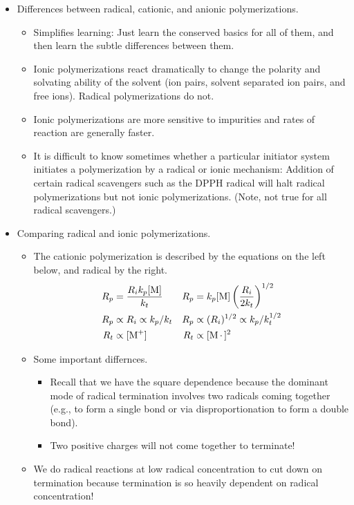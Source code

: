 \documentclass[../notes.tex]{subfiles}
\begin{document}
\begin{itemize}
    \item Differences between radical, cationic, and anionic polymerizations.
    \begin{itemize}
        \item Simplifies learning: Just learn the conserved basics for all of them, and then learn the subtle differences between them.
        \item Ionic polymerizations react dramatically to change the polarity and solvating ability of the solvent (ion pairs, solvent separated ion pairs, and free ions). Radical polymerizations do not.
        \item Ionic polymerizations are more sensitive to impurities and rates of reaction are generally faster.
        \item It is difficult to know sometimes whether a particular initiator system initiates a polymerization by a radical or ionic mechanism: Addition of certain radical scavengers such as the DPPH radical will halt radical polymerizations but not ionic polymerizations. (Note, not true for all radical scavengers.)
    \end{itemize}
    \item Comparing radical and ionic polymerizations.
    \begin{itemize}
        \item The cationic polymerization is described by the equations on the left below, and radical by the right.
        \begin{align*}
            R_p &= \frac{R_ik_p[\ce{M}]}{k_t}&
                R_p &= k_p[\ce{M}]\left( \frac{R_i}{2k_t} \right)^{1/2}\\
            R_p &\propto R_i \propto k_p/k_t&
                R_p &\propto (R_i)^{1/2} \propto k_p/k_t^{1/2}\\
            R_t &\propto [\ce{M+}]&
                R_t &\propto [\ce{M*}]^2
        \end{align*}
        \item Some important differnces.
        \begin{itemize}
            \item Recall that we have the square dependence because the dominant mode of radical termination involves two radicals coming together (e.g., to form a single bond or via disproportionation to form a double bond).
            \item Two positive charges will not come together to terminate!
        \end{itemize}
        \item We do radical reactions at low radical concentration to cut down on termination because termination is so heavily dependent on radical concentration!

\end{itemize}
\end{itemize}
\end{document}
